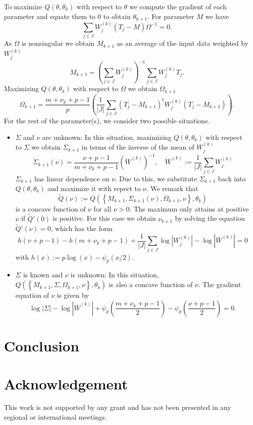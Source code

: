 \documentclass[english,listof=totoc]{scrartcl}
\begin{document}
To maximize $Q(\theta,\theta_k)$ with respect to $\theta$ we compute the gradient of each parameter and equate them to $0$ to obtain $\theta_{k+1}$. For parameter $M$ we have
\begin{equation}
\sum_{j\in J}W_j^{(k)}\left(T_j-M\right)\Omega^{-1}=0.
\end{equation}
As $\Omega$ is nonsingular we obtain $M_{k+1}$ as an average of the input data weighted by $W_j^{(k)}$
\begin{equation}
M_{k+1}=\left(\sum_{j\in J}W_j^{(k)}\right)^{-1}\sum_{j\in J}W_j^{(k)}T_j.\label{eq:M}
\end{equation}
Maximizing $Q(\theta,\theta_k)$ with respect to $\Omega$ we obtain $\Omega_{k+1}$
\begin{equation}
\Omega_{k+1}=\frac{m+\nu_k+p-1}{p}\left(\frac{1}{|J|}\sum_{j\in J}(T_j-M_{k+1})^{\textrm{t}}W_j^{(k)}(T_j-M_{k+1})\right).\label{eq:Omega}
\end{equation}
For the rest of the parameter(s), we consider two possible situations.
\begin{itemize}
\item $\Sigma$ and $\nu$ are unknown: In this situation, maximizing $Q(\theta,\theta_k)$ with respect to $\Sigma$ we obtain $\Sigma_{k+1}$ in terms of the inverse of the mean of $W_j^{{(k)}}$
\begin{equation}
\Sigma_{k+1}(\nu)=\frac{\nu+p-1}{m+\nu_k+p-1}\left(\bar{W}^{(k)}\right)^{-1},\quad \bar{W}^{(k)}:=\frac{1}{|J|}\sum_{j\in J}W_j^{(k)}\label{eq:Sigma}
\end{equation}
$\Sigma_{k+1}$ has linear dependence on $\nu$. Due to this, we substitute $\Sigma_{k+1}$ back into $Q(\theta,\theta_k)$ and maximize it with repect to $\nu$. We remark that
\[\tilde{Q}(\nu):=Q\left(\left\{M_{k+1},\Sigma_{k+1}(\nu),\Omega_{k+1},\nu\right\},\theta_k\right)\]
is a concave function of $\nu$ for all $\nu>0$. The maximum only attains at positive $\nu$ if $\tilde{Q}'(0)$ is positive. For this case we obtain $\nu_{k+1}$ by solving the equation $\tilde{Q}'(\nu)=0$, which has the form
\begin{equation}
h(\nu+p-1)-h(m+\nu_k+p-1)+\frac{1}{|J|}\sum_{j\in J}\log|W_j^{(k)}|-\log\left|\bar{W}^{(k)}\right|=0\label{eq:nu1}
\end{equation}
with $h(x):=p\log(x)-\psi_p(x/2)$.
\item $\Sigma$ is known and $\nu$ is unknown: In this situation, $Q\left(\left\{M_{k+1},\Sigma,\Omega_{k+1},\nu\right\},\theta_k\right)$ is also a concave function of $\nu$. The gradient equation of $\nu$ is given by
\begin{equation}
\log|\Sigma|-\log\left|\bar{W}^{(k)}\right|+\psi_{p}\left(\frac{m+\nu_k+p-1}{2}\right)-\psi_{p}\left(\frac{\nu+p-1}{2}\right)=0.\label{eq:nu2}
\end{equation}
\end{itemize}

\section{Conclusion}\label{sec:conclusion}

\section*{Acknowledgement}
This work is not supported by any grant and has not been presented in any regional or international meetings.



\end{document}
